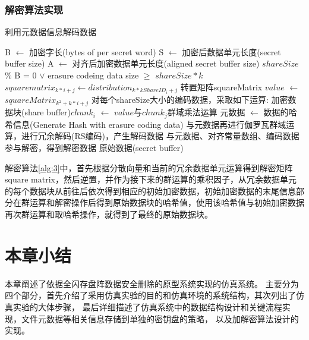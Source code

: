 \subsubsection{解密算法实现}
\begin{algorithm}[htb]
    \caption{利用元数据信息解码数据}%
	\label{alg:3}
	\begin{algorithmic}
        \STATE B $\gets$ 加密字长(bytes of per secret word)
        \STATE S $\gets$ 加密后数据单元长度(secret buffer size)
        \STATE A $\gets$ 对齐后加密数据单元长度(aligned secret buffer size)
		\ENSURE $shareSize$ \% B = 0 $\vee$ erasure codeing data size $\ge$ $shareSize * k$
		\STATE $square matrix_{k*i+j} \gets distribution_{k*kShareID_{i}+j}$
		\ENDFOR
		\ENDFOR
		\STATE 转置矩阵squareMatrix %
		\STATE $value$ $\gets$ $squareMatrix_{k^2+k*i+j}$
 		\STATE
        对每个shareSize大小的编码数据，采取如下运算:
        加密数据块(share buffer)$chunk_i$ $\gets$ $value$与$chunk_j$群域乘法运算
		\ENDFOR
		\ENDFOR
        \STATE 元数据 $\gets$ 数据的哈希信息(Generate Hash with erasure coding data)
        \STATE 与元数据再进行伽罗瓦群域运算，进行冗余解码(RS编码)，产生解码数据%
        \STATE 与元数据、对齐常量数组、编码数据参与解密，得到解密数据
		\STATE %
        \RETURN 原始数据(secret buffer)
	\end{algorithmic}
\end{algorithm}
解密算法\autoref{alg:3}中，首先根据分散向量和当前的冗余数据单元运算得到解密矩阵square matrix，然后逆置，并作为接下来的群运算的乘积因子，从冗余数据单元的每个数据块从前往后依次得到相应的初始加密数据，初始加密数据的末尾信息部分在群运算和解密操作后得到原始数据块的哈希值，使用该哈希值与初始加密数据再次群运算和取哈希操作，就得到了最终的原始数据块。
\section{本章小结}
本章阐述了依据全闪存盘阵数据安全删除的原型系统实现的仿真系统。
主要分为四个部分，首先介绍了采用仿真实验的目的和仿真环境的系统结构，其次列出了仿真实验的大体步骤，
最后详细描述了仿真系统中的数据结构设计和关键流程实现，文件元数据等相关信息存储到单独的密钥盘的策略，
以及加解密算法设计的实现。
